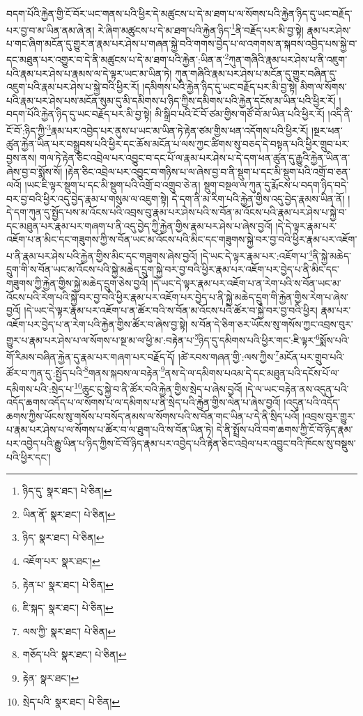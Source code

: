 བདག་པོའི་རྐྱེན་གྱི་ངོ་བོར་ཡང་གནས་པའི་ཕྱིར་དེ་མཚུངས་པ་དེ་མ་ཐག་པ་ལ་སོགས་པའི་རྐྱེན་ཉིད་དུ་ཡང་བརྗོད་པར་བྱ་བ་མ་ཡིན་ནམ་ཞེ་ན། རེ་ཞིག་མཚུངས་པ་དེ་མ་ཐག་པའི་རྐྱེན་ཉིད་\footnote{ཉིད་དུ་  སྣར་ཐང་།  པེ་ཅིན། }ནི་བརྗོད་པར་མི་བྱ་སྟེ། རྣམ་པར་ཤེས་པ་གང་ཞིག་མངོན་དུ་གྱུར་ན་རྣམ་པར་ཤེས་པ་གཞན་སྐྱེ་བའི་གགས་བྱེད་པ་ལ་འགགས་ན་སྐབས་འབྱེད་པས་སྐྱེ་བ་དང་མཐུན་པར་འགྱུར་བ་དེ་ནི་མཚུངས་པ་དེ་མ་ཐག་པའི་རྐྱེན་:ཡིན་ན་\footnote{ཡིན་ནོ་  སྣར་ཐང་།  པེ་ཅིན། }ཀུན་གཞིའི་རྣམ་པར་ཤེས་པ་ནི་འཇུག་པའི་རྣམ་པར་ཤེས་པ་རྣམས་ལ་དེ་ལྟར་ཡང་མ་ཡིན་ཏེ། ཀུན་གཞིའི་རྣམ་པར་ཤེས་པ་མངོན་དུ་གྱུར་བཞིན་དུ་འཇུག་པའི་རྣམ་པར་ཤེས་པ་སྐྱེ་བའི་ཕྱིར་རོ། །དམིགས་པའི་རྐྱེན་ཉིད་དུ་ཡང་བརྗོད་པར་མི་བྱ་སྟེ། མིག་ལ་སོགས་པའི་རྣམ་པར་ཤེས་པས་མངོན་སུམ་དུ་མི་དམིགས་པ་ཉིད་ཀྱིས་དམིགས་པའི་རྐྱེན་དངོས་མ་ཡིན་པའི་ཕྱིར་རོ། །བདག་པོའི་རྐྱེན་ཉིད་དུ་ཡང་བརྗོད་པར་མི་བྱ་སྟེ། མི་སྒྲིབ་པའི་ངོ་བོ་ཙམ་གྱིས་གཙོ་བོ་མ་ཡིན་པའི་ཕྱིར་རོ། །འདི་ནི་ངོ་བོ་:ཉིད་ཀྱི་\footnote{ཉིད་  སྣར་ཐང་།  པེ་ཅིན། }རྣམ་པར་འབྱེད་པར་ནུས་པ་ཡང་མ་ཡིན་ཏེ་རྟེན་ཙམ་གྱིས་ཕན་འདོགས་པའི་ཕྱིར་རོ། །སྔར་ཕན་ཚུན་རྐྱེན་ཡིན་པར་བསྒྲུབས་པའི་ཕྱིར་དང་ཆོས་མངོན་པ་ལས་ཀྱང་ཚིགས་སུ་བཅད་དེ་བསྟན་པའི་ཕྱིར་གྲུབ་པར་བྱས་ནས། གལ་ཏེ་རྟེན་ཅིང་འབྲེལ་པར་འབྱུང་བ་དང་པོ་ལ་རྣམ་པར་ཤེས་པ་དེ་དག་ཕན་ཚུན་དུ་རྒྱུའི་རྐྱེན་ཡིན་ན་ཞེས་བྱ་བ་སྨོས་སོ། །རྟེན་ཅིང་འབྲེལ་པར་འབྱུང་བ་གཉིས་པ་ལ་ཞེས་བྱ་བ་ནི་སྡུག་པ་དང་མི་སྡུག་པའི་འགྲོ་བ་ཅན་ལའོ། །ཡང་ཇི་ལྟར་སྡུག་པ་དང་མི་སྡུག་པའི་འགྲོ་བ་འགྲུབ་ཅེ་ན། སྡུག་བསྔལ་ལ་ཀུན་དུ་རྨོངས་པ་བདག་ཉིད་བདེ་བར་བྱ་བའི་ཕྱིར་འདུ་བྱེད་རྣམ་པ་གསུམ་ལ་འཇུག་སྟེ། དེ་དག་ནི་མ་རིག་པའི་རྐྱེན་གྱིས་འདུ་བྱེད་རྣམས་ཡིན་ནོ། །དེ་དག་ཀུན་དུ་སྤྱོད་པས་མ་འོངས་པའི་འབྲས་བུ་རྣམ་པར་ཤེས་པའི་ས་བོན་མ་འོངས་པའི་རྣམ་པར་ཤེས་པ་སྐྱེ་བ་དང་མཐུན་པར་རྣམ་པར་གཞག་པ་ནི་འདུ་བྱེད་ཀྱི་རྐྱེན་གྱིས་རྣམ་པར་ཤེས་པ་ཞེས་བྱའོ། །དེ་དེ་ལྟར་རྣམ་པར་འཇོག་པ་ན་མིང་དང་གཟུགས་ཀྱི་ས་བོན་ཡང་མ་འོངས་པའི་མིང་དང་གཟུགས་སྐྱེ་བར་བྱ་བའི་ཕྱིར་རྣམ་པར་འཇོག་པ་ནི་རྣམ་པར་ཤེས་པའི་རྐྱེན་གྱིས་མིང་དང་གཟུགས་ཞེས་བྱའོ། །དེ་ཡང་དེ་ལྟར་རྣམ་པར་:འཇོག་པ་\footnote{འཇོག་པར་  སྣར་ཐང་། }ནི་སྐྱེ་མཆེད་དྲུག་གི་ས་བོན་ཡང་མ་འོངས་པའི་སྐྱེ་མཆེད་དྲུག་སྐྱེ་བར་བྱ་བའི་ཕྱིར་རྣམ་པར་འཇོག་པར་བྱེད་པ་ནི་མིང་དང་གཟུགས་ཀྱི་རྐྱེན་གྱིས་སྐྱེ་མཆེད་དྲུག་ཅེས་བྱའོ། །དེ་ཡང་དེ་ལྟར་རྣམ་པར་འཇོག་པ་ན་རེག་པའི་ས་བོན་ཡང་མ་འོངས་པའི་རེག་པའི་སྐྱེ་བར་བྱ་བའི་ཕྱིར་རྣམ་པར་འཇོག་པར་བྱེད་པ་ནི་སྐྱེ་མཆེད་དྲུག་གི་རྐྱེན་གྱིས་རེག་པ་ཞེས་བྱའོ། །དེ་ཡང་དེ་ལྟར་རྣམ་པར་འཇོག་པ་ན་ཚོར་བའི་ས་བོན་མ་འོངས་པའི་ཚོར་བ་སྐྱེ་བར་བྱ་བའི་ཕྱིར། རྣམ་པར་འཇོག་པར་བྱེད་པ་ན་རེག་པའི་རྐྱེན་གྱིས་ཚོར་བ་ཞེས་བྱ་སྟེ། ས་བོན་དེ་ཅིག་ཅར་ཡོངས་སུ་གསོས་ཀྱང་འབྲས་བུར་གྱུར་པ་རྣམ་པར་ཤེས་པ་ལ་སོགས་པ་སྔ་མ་ལ་ཕྱི་མ་:བརྟེན་པ་\footnote{རྟེན་པ་  སྣར་ཐང་།  པེ་ཅིན། }ཉིད་དུ་དམིགས་པའི་ཕྱིར་གང་:ཇི་ལྟར་\footnote{ཇི་སྐད་  སྣར་ཐང་།  པེ་ཅིན། }སྨོས་པའི་གོ་རིམས་བཞིན་རྐྱེན་དུ་རྣམ་པར་གཞག་པར་བརྗོད་དོ། །ཚེ་རབས་གཞན་གྱི་:ལས་ཀྱིས་\footnote{ལས་ཀྱི་  སྣར་ཐང་།  པེ་ཅིན། }མངོན་པར་གྲུབ་པའི་ཚོར་བ་ཀུན་དུ་:སྤྱོད་པའི་\footnote{གཅོད་པའི་  སྣར་ཐང་།  པེ་ཅིན། }གནས་སྐབས་ལ་བརྟེན་\footnote{རྟེན་  སྣར་ཐང་། }ནས་དེ་ལ་དམིགས་པའམ་དེ་དང་མཐུན་པའི་དངོས་པོ་ལ་དམིགས་པའི་:སྲེད་པ་\footnote{སྲེད་པའི་  སྣར་ཐང་།  པེ་ཅིན། }ཆུང་ངུ་སྐྱེ་བ་ནི་ཚོར་བའི་རྐྱེན་གྱིས་སྲེད་པ་ཞེས་བྱའོ། །དེ་ལ་ཡང་བརྟེན་ནས་འདུན་པའི་འདོད་ཆགས་འདོད་པ་ལ་སོགས་པ་ལ་དམིགས་པ་ནི་སྲེད་པའི་རྐྱེན་གྱིས་ལེན་པ་ཞེས་བྱའོ། །འདུན་པའི་འདོད་ཆགས་ཀྱིས་ཡོངས་སུ་གསོས་པ་བསོད་ནམས་ལ་སོགས་པའི་ས་བོན་གང་ཡིན་པ་དེ་ནི་སྲིད་པའོ། །འབྲས་བུར་གྱུར་པ་རྣམ་པར་ཤེས་པ་ལ་སོགས་པ་ཚོར་བ་ལ་ཐུག་པའི་ས་བོན་ཡིན་ཏེ། དེ་ནི་སྤྲོས་པའི་བག་ཆགས་ཀྱི་ངོ་བོ་ཉིད་རྣམ་པར་འབྱེད་པའི་རྒྱུ་ཡིན་པ་ཉིད་ཀྱིས་ངོ་བོ་ཉིད་རྣམ་པར་འབྱེད་པའི་རྟེན་ཅིང་འབྲེལ་པར་འབྱུང་བའི་ཁོངས་སུ་བསྡུས་པའི་ཕྱིར་དང་། 
